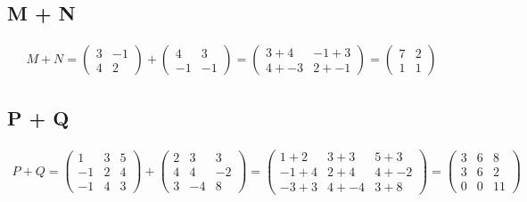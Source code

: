 \documentclass[a4paper,10pt]{article}
\begin{document}
    \subsection{M + N}
      \begin{align*}
        M + N =
        \begin{pmatrix}
          3 & -1\\
          4 &  2
        \end{pmatrix}
        +
        \begin{pmatrix}
           4 &  3\\
          -1 & -1
        \end{pmatrix}
        =
        \begin{pmatrix}
          3 +  4 & -1 +  3\\
          4 + -3 &  2 + -1
        \end{pmatrix}
        =
        \begin{pmatrix}
          7 & 2\\
          1 & 1
        \end{pmatrix}
      \end{align*}
    \subsection{P + Q}
      \begin{align*}
        P + Q =
        \begin{pmatrix}
           1 & 3 & 5\\
          -1 & 2 & 4\\
          -1 & 4 & 3
        \end{pmatrix}
        +
        \begin{pmatrix}
          2 & 3 & 3\\
          4 & 4 & -2\\
          3 & -4 & 8
        \end{pmatrix}
        =
        \begin{pmatrix}
          1 + 2 & 3 + 3 & 5 + 3\\
          -1 + 4 & 2 + 4 & 4 + -2\\
          -3 + 3 & 4 + -4 & 3 + 8
        \end{pmatrix}
        =
        \begin{pmatrix}
          3 & 6 & 8\\
          3 & 6 & 2\\
          0 & 0 & 11
        \end{pmatrix}
      \end{align*}
\end{document}
